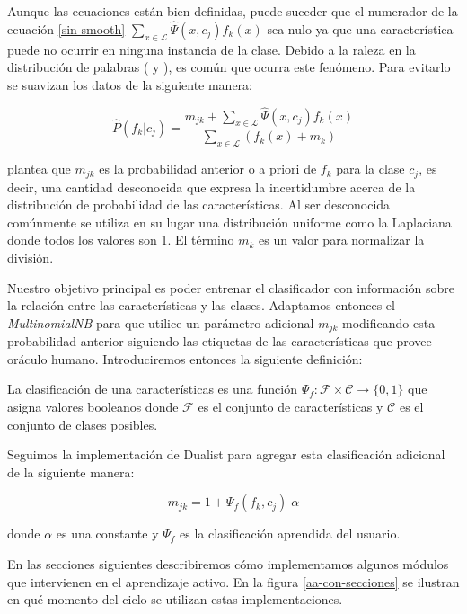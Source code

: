 Aunque las ecuaciones están bien definidas, puede suceder que el numerador de la ecuación \ref{sin-smooth} $\sum_{x \in \mathcal{L}} \hat{\Psi}(x, c_j) f_k(x)$ sea nulo ya que una característica puede no ocurrir en ninguna instancia de la clase. Debido a la raleza en la distribución de palabras (\citet{zipf1} y \citet{zipf2}), es común que ocurra este fenómeno. Para evitarlo se suavizan los datos de la siguiente manera:

\begin{equation}
\hat{P}(f_k|c_j) = \frac{m_{jk} + \sum_{x \in \mathcal{L}} \hat{\Psi}(x, c_j) f_k(x)}{\sum_{x \in \mathcal{L}} (f_k(x) + m_k)}
\end{equation}

\citet{dualist} plantea que $m_{jk}$ es la probabilidad anterior o a priori de $f_k$ para la clase $c_j$, es decir, una cantidad desconocida que expresa la incertidumbre acerca de la distribución de probabilidad de las características. Al ser desconocida comúnmente se utiliza en su lugar una distribución uniforme como la Laplaciana donde todos los valores son 1. El término $m_k$ es un valor para normalizar la división.

Nuestro objetivo principal es poder entrenar el clasificador con información sobre la relación entre las características y las clases. Adaptamos entonces el \textit{MultinomialNB} para que utilice un parámetro adicional $m_{jk}$ modificando esta probabilidad anterior siguiendo las etiquetas de las características que provee oráculo humano. Introduciremos entonces la siguiente definición:

\begin{definition}
La clasificación de una características es una función $\Psi_f:\mathcal{F} \times \mathcal{C} \rightarrow \{0, 1\}$ que asigna valores booleanos donde $\mathcal{F}$ es el conjunto de características y $\mathcal{C}$ es el conjunto de clases posibles.
\end{definition}

Seguimos la implementación de Dualist para agregar esta clasificación adicional de la siguiente manera:

\begin{equation}\label{eq-feat-boost}
m_{jk} = 1 + \Psi_f(f_k, c_j) \; \alpha
\end{equation}

donde $\alpha$ es una constante y $\Psi_f$ es la clasificación aprendida del usuario.

\vspace{5 mm}
En las secciones siguientes describiremos cómo implementamos algunos módulos que intervienen en el aprendizaje activo. En la figura \ref{aa-con-secciones} se ilustran en qué momento del ciclo se utilizan estas implementaciones.

